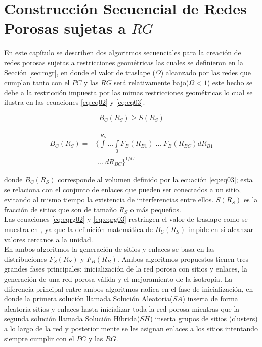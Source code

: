 \chapter[Construcción Secuencial]{Construcción Secuencial de Redes Porosas sujetas a $RG$}
\label{champ:BSGR}
\bigskip
\barra
\bigskip

En este capítulo se describen dos algoritmos secuenciales para la creación de redes porosas sujetas a restricciones geométricas las cuales se definieron en la Sección \ref{sec:mgr}, en donde el valor de traslape ($\Omega$) alcanzado por las redes que cumplan tanto con el $PC$ y las $RG$ será relativamente bajo($\Omega<1$) este hecho se debe a la restricción impuesta por las mimas restricciones geométricas lo cual se ilustra en las ecuaciones \ref{eq:eq02} y \ref{eq:eq03}.

\begin{equation}
B_C(R_S) \geq S(R_S)
\label{eq:eqrg02}
\end{equation}

\begin{eqnarray}
\nonumber \\
B_C(R_S) = & \{\int\limits^{R_S} ... \int\limits_{0} F_B(R_{B1})\; ... \; F_B(R_{BC})dR_{B1} \nonumber \\
& \; \ldots \; dR_{BC} \}^{1/C}
\label{eq:eqrg03}
\end{eqnarray}

donde $B_C(R_S)$ corresponde al volumen definido por la ecuación \ref{eq:eq03}; esta se relaciona con el conjunto de enlaces que pueden ser conectados a un sitio, evitando al mismo tiempo la existencia de interferencias entre ellos. $S(R_S)$ es la fracción de sitios que son de tamaño $R_S$ o más pequeños.\\

Las ecuaciones \ref{eq:eqrg02} y \ref{eq:eqrg03} restringen el valor de traslape como se muestra en \cite{ref5}, ya que la definición matemática de $B_C(R_S)$ impide en si alcanzar valores cercanos a la unidad.\\

En ambos algoritmos la generación de sitios y enlaces se basa en las distribuciones $F_S(R_S)$ y $F_B(R_B)$. Ambos algoritmos propuestos  tienen tres grandes fases principales: inicialización de la red porosa con sitios y enlaces, la generación de una red porosa válida y el mejoramiento de la isotropía. La diferencia principal entre ambos algoritmos radica en el fase de inicialización, en donde la primera solución llamada Solución Aleatoria($SA$) inserta de forma aleatoria sitios y enlaces hasta inicializar toda la red porosa mientras que la segunda solución llamada Solución Híbrida($SH$) inserta grupos de sitios (clusters) a lo largo de la red y posterior mente se les asignan enlaces a los sitios intentando siempre cumplir con el $PC$ y las $RG$.\\

